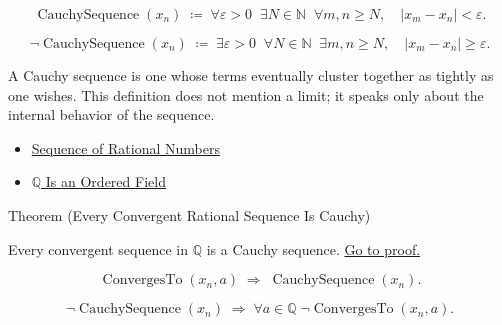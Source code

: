 \begin{remark*}
\[
\operatorname{CauchySequence}(x_n)
\;\coloneqq\;
\forall \varepsilon>0\;\;\exists N\in\mathbb{N}\;\;\forall m,n\ge N,\quad
|x_m-x_n|<\varepsilon.
\]
\end{remark*}

\begin{remark*}
\[
\neg\operatorname{CauchySequence}(x_n)
\;\coloneqq\;
\exists \varepsilon>0\;\;\forall N\in\mathbb{N}\;\;\exists m,n\ge N,\quad
|x_m-x_n|\ge\varepsilon.
\]
\end{remark*}

\begin{remark*}[Interpretation]
A Cauchy sequence is one whose terms eventually cluster together as tightly
as one wishes. This definition does not mention a limit; it speaks only about
the internal behavior of the sequence.
\end{remark*}

\begin{dependencies}
\begin{itemize}
  \item \hyperref[def:rational-sequence]{Sequence of Rational Numbers}
  \item \hyperref[thm:q-is-ordered-field]{$\mathbb{Q}$ Is an Ordered Field}
\end{itemize}
\end{dependencies}

\begin{theorembox}{Theorem (Every Convergent Rational Sequence Is Cauchy)}
\begin{theorem}
\label{thm:convergent-implies-cauchy-q}
Every convergent sequence in $\mathbb{Q}$ is a Cauchy sequence.
\hyperref[prf:convergent-implies-cauchy-q]{Go to proof.}
\end{theorem}
\end{theorembox}

\begin{remark*}
\[
\operatorname{ConvergesTo}(x_n, a)
\;\Longrightarrow\;
\operatorname{CauchySequence}(x_n).
\]
\end{remark*}

\begin{remark*}
\[
\neg\operatorname{CauchySequence}(x_n)
\;\Longrightarrow\;
\forall a\in\mathbb{Q}\;\neg\operatorname{ConvergesTo}(x_n, a).
\]
\end{remark*}


